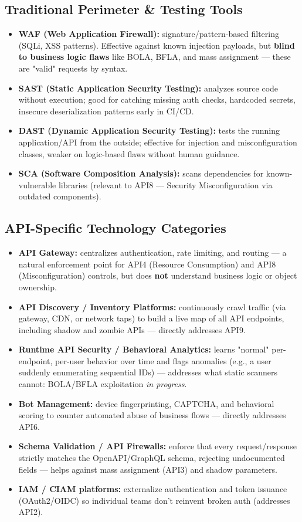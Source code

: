 \documentclass[11pt]{article}
\begin{document}
\subsection{Traditional Perimeter \& Testing Tools}
\begin{itemize}
  \item \textbf{WAF (Web Application Firewall):} signature/pattern-based filtering (SQLi, XSS patterns). Effective against known injection payloads, but \textbf{blind to business logic flaws} like BOLA, BFLA, and mass assignment --- these are "valid" requests by syntax.
  \item \textbf{SAST (Static Application Security Testing):} analyzes source code without execution; good for catching missing auth checks, hardcoded secrets, insecure deserialization patterns early in CI/CD.
  \item \textbf{DAST (Dynamic Application Security Testing):} tests the running application/API from the outside; effective for injection and misconfiguration classes, weaker on logic-based flaws without human guidance.
  \item \textbf{SCA (Software Composition Analysis):} scans dependencies for known-vulnerable libraries (relevant to API8 --- Security Misconfiguration via outdated components).
\end{itemize}

\subsection{API-Specific Technology Categories}
\begin{itemize}
  \item \textbf{API Gateway:} centralizes authentication, rate limiting, and routing --- a natural enforcement point for API4 (Resource Consumption) and API8 (Misconfiguration) controls, but does \textbf{not} understand business logic or object ownership.
  \item \textbf{API Discovery / Inventory Platforms:} continuously crawl traffic (via gateway, CDN, or network taps) to build a live map of all API endpoints, including shadow and zombie APIs --- directly addresses API9.
  \item \textbf{Runtime API Security / Behavioral Analytics:} learns "normal" per-endpoint, per-user behavior over time and flags anomalies (e.g., a user suddenly enumerating sequential IDs) --- addresses what static scanners cannot: BOLA/BFLA exploitation \textit{in progress}.
  \item \textbf{Bot Management:} device fingerprinting, CAPTCHA, and behavioral scoring to counter automated abuse of business flows --- directly addresses API6.
  \item \textbf{Schema Validation / API Firewalls:} enforce that every request/response strictly matches the OpenAPI/GraphQL schema, rejecting undocumented fields --- helps against mass assignment (API3) and shadow parameters.
  \item \textbf{IAM / CIAM platforms:} externalize authentication and token issuance (OAuth2/OIDC) so individual teams don't reinvent broken auth (addresses API2).
\end{itemize}
\end{document}
